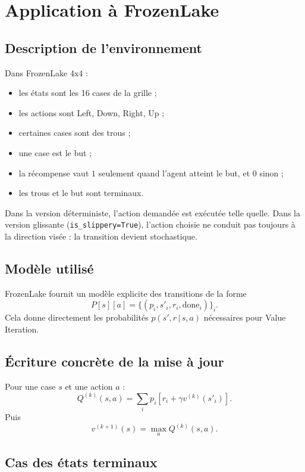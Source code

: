 \documentclass[11pt,a4paper]{article}
\newcommand{\given}{\,|\,}
\begin{document}
\section{Application à FrozenLake}

\subsection{Description de l'environnement}

Dans FrozenLake 4x4 :
\begin{itemize}[leftmargin=1.6em]
    \item les états sont les 16 cases de la grille ;
    \item les actions sont Left, Down, Right, Up ;
    \item certaines cases sont des trous ;
    \item une case est le but ;
    \item la récompense vaut $1$ seulement quand l'agent atteint le but, et $0$ sinon ;
    \item les trous et le but sont terminaux.
\end{itemize}

Dans la version déterministe, l'action demandée est exécutée telle quelle. Dans la version glissante (\texttt{is\_slippery=True}), l'action choisie ne conduit pas toujours à la direction visée : la transition devient stochastique.

\subsection{Modèle utilisé}

FrozenLake fournit un modèle explicite des transitions de la forme
\[
P[s][a] = \{(p_i,s'_i,r_i,\text{done}_i)\}_i.
\]
Cela donne directement les probabilités $p(s',r\given s,a)$ nécessaires pour Value Iteration.

\subsection{Écriture concrète de la mise à jour}

Pour une case $s$ et une action $a$ :
\[
Q^{(k)}(s,a)=\sum_i p_i \left[r_i+\gamma v^{(k)}(s'_i)\right].
\]
Puis
\[
v^{(k+1)}(s)=\max_a Q^{(k)}(s,a).
\]

\subsection{Cas des états terminaux}
\end{document}
